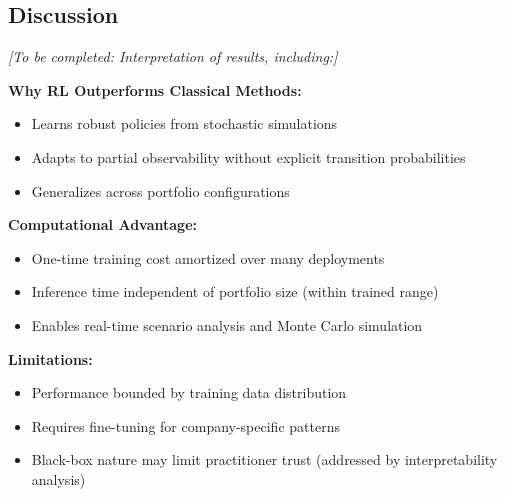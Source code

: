 \subsection{Discussion}

\textit{[To be completed: Interpretation of results, including:]}

\textbf{Why RL Outperforms Classical Methods:}
\begin{itemize}
    \item Learns robust policies from stochastic simulations
    \item Adapts to partial observability without explicit transition probabilities
    \item Generalizes across portfolio configurations
\end{itemize}

\textbf{Computational Advantage:}
\begin{itemize}
    \item One-time training cost amortized over many deployments
    \item Inference time independent of portfolio size (within trained range)
    \item Enables real-time scenario analysis and Monte Carlo simulation
\end{itemize}

\textbf{Limitations:}
\begin{itemize}
    \item Performance bounded by training data distribution
    \item Requires fine-tuning for company-specific patterns
    \item Black-box nature may limit practitioner trust (addressed by interpretability analysis)
\end{itemize}
